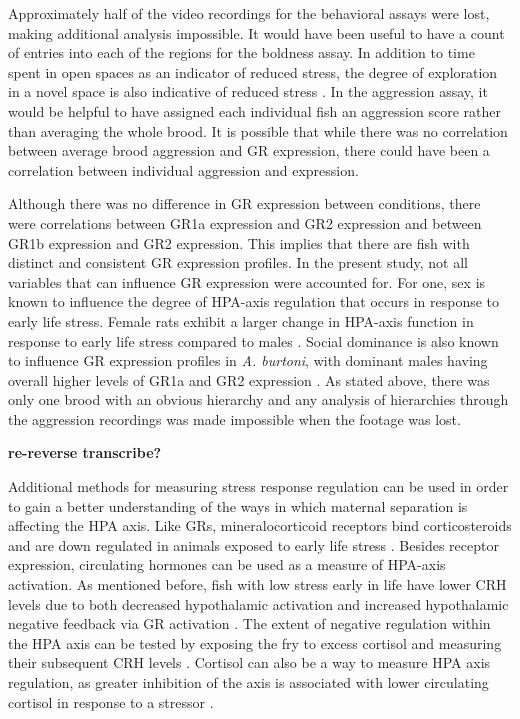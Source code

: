 \documentclass[12pt,twoside]{reedthesis}
\begin{document}
Approximately half of the video recordings for the behavioral assays
were lost, making additional analysis impossible. It would have been useful to
have a count of entries into each of the regions for the boldness assay. In
addition to time spent in open spaces as an indicator of reduced
stress, the degree of exploration in a novel space is also indicative of
reduced stress \citep{bannier_early_2017}. In the aggression assay, it would be helpful to have assigned
each individual fish an aggression score rather than averaging the whole brood.
It is possible that while there was no correlation between average brood
aggression and GR expression, there could have been a correlation between
individual aggression and expression. 

Although there was no difference in GR expression between conditions, there were
correlations between GR1a expression and GR2 expression and between GR1b
expression and GR2 expression. This implies that there are fish with distinct
and consistent GR expression profiles. In the present study, not all variables that can influence GR expression were
accounted for. For one, sex is known to influence the degree of HPA-axis
regulation that occurs in response to early life stress. Female rats exhibit a
larger change in HPA-axis function in response to early life stress compared to males \citep{mccormick_sex-specific_1995}. Social dominance is also known to influence
GR expression profiles in \textit{A. burtoni}, with dominant
males having overall higher levels of GR1a and GR2 expression
\citep{korzan_social_2014}. As stated above, there was only one brood with an
obvious hierarchy and any analysis of hierarchies through the aggression
recordings was made impossible when the footage was lost.

\textbf{re-reverse transcribe?}

Additional methods for measuring stress response regulation can be used in order
to gain a better understanding of the ways in which maternal separation is
affecting the HPA axis. Like GRs, mineralocorticoid receptors bind
corticosteroids and are
down regulated in animals exposed to early life stress \citep{gass_mice_2001, meaney_early_1996}.
Besides receptor expression, circulating hormones can be used
as a measure of HPA-axis activation. As mentioned
before, fish with low stress early in life have lower CRH levels due to both
decreased hypothalamic activation and increased hypothalamic negative feedback via
GR activation \citep{taborsky_stable_2012}. The extent of negative regulation
within the HPA axis can be tested by exposing the fry to excess cortisol and
measuring their subsequent CRH levels \citep{liu_maternal_2000}. Cortisol can also be a way to measure HPA
axis regulation, as greater inhibition of the axis is associated with lower
circulating cortisol in response to a stressor \citep{liu_maternal_2000}.
\end{document}
